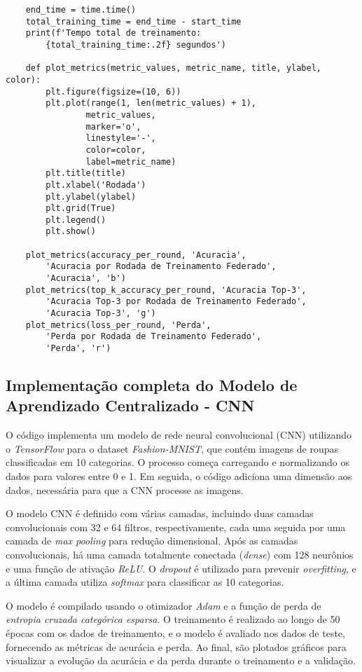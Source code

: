 \begin{lstlisting}
    end_time = time.time()
    total_training_time = end_time - start_time
    print(f'Tempo total de treinamento: 
        {total_training_time:.2f} segundos')

    def plot_metrics(metric_values, metric_name, title, ylabel, color):
        plt.figure(figsize=(10, 6))
        plt.plot(range(1, len(metric_values) + 1), 
                metric_values, 
                marker='o', 
                linestyle='-', 
                color=color, 
                label=metric_name)
        plt.title(title)
        plt.xlabel('Rodada')
        plt.ylabel(ylabel)
        plt.grid(True)
        plt.legend()
        plt.show()

    plot_metrics(accuracy_per_round, 'Acuracia', 
        'Acuracia por Rodada de Treinamento Federado', 
        'Acuracia', 'b')
    plot_metrics(top_k_accuracy_per_round, 'Acuracia Top-3', 
        'Acuracia Top-3 por Rodada de Treinamento Federado', 
        'Acuracia Top-3', 'g')
    plot_metrics(loss_per_round, 'Perda', 
        'Perda por Rodada de Treinamento Federado', 
        'Perda', 'r')
\end{lstlisting}

\subsection{Implementação completa do Modelo de Aprendizado Centralizado - CNN}

O código implementa um modelo de rede neural convolucional (CNN) utilizando o \textit{TensorFlow} para o dataset \textit{Fashion-MNIST}, que contém imagens de roupas classificadas em 10 categorias. O processo começa carregando e normalizando os dados para valores entre 0 e 1. Em seguida, o código adiciona uma dimensão aos dados, necessária para que a CNN processe as imagens.

O modelo CNN é definido com várias camadas, incluindo duas camadas convolucionais com 32 e 64 filtros, respectivamente, cada uma seguida por uma camada de \textit{max pooling} para redução dimensional. Após as camadas convolucionais, há uma camada totalmente conectada (\textit{dense}) com 128 neurônios e uma função de ativação \textit{ReLU}. O \textit{dropout} é utilizado para prevenir \textit{overfitting}, e a última camada utiliza \textit{softmax} para classificar as 10 categorias.

O modelo é compilado usando o otimizador \textit{Adam} e a função de perda de \textit{entropia cruzada categórica esparsa}. O treinamento é realizado ao longo de 50 épocas com os dados de treinamento, e o modelo é avaliado nos dados de teste, fornecendo as métricas de acurácia e perda. Ao final, são plotados gráficos para visualizar a evolução da acurácia e da perda durante o treinamento e a validação.

